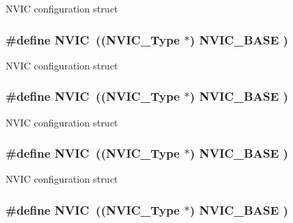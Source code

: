 N\-V\-I\-C configuration struct \hypertarget{group___c_m_s_i_s__core__base_gac8e97e8ce56ae9f57da1363a937f8a17}{
\subsubsection[{N\-V\-I\-C}]{\setlength{\rightskip}{0pt plus 5cm}\#define N\-V\-I\-C~(({\bf N\-V\-I\-C\-\_\-\-Type}      $\ast$)     {\bf N\-V\-I\-C\-\_\-\-B\-A\-S\-E}     )}}\label{group___c_m_s_i_s__core__base_gac8e97e8ce56ae9f57da1363a937f8a17}
N\-V\-I\-C configuration struct \hypertarget{group___c_m_s_i_s__core__base_gac8e97e8ce56ae9f57da1363a937f8a17}{
\subsubsection[{N\-V\-I\-C}]{\setlength{\rightskip}{0pt plus 5cm}\#define N\-V\-I\-C~(({\bf N\-V\-I\-C\-\_\-\-Type}      $\ast$)     {\bf N\-V\-I\-C\-\_\-\-B\-A\-S\-E}     )}}\label{group___c_m_s_i_s__core__base_gac8e97e8ce56ae9f57da1363a937f8a17}
N\-V\-I\-C configuration struct \hypertarget{group___c_m_s_i_s__core__base_gac8e97e8ce56ae9f57da1363a937f8a17}{
\subsubsection[{N\-V\-I\-C}]{\setlength{\rightskip}{0pt plus 5cm}\#define N\-V\-I\-C~(({\bf N\-V\-I\-C\-\_\-\-Type}      $\ast$)     {\bf N\-V\-I\-C\-\_\-\-B\-A\-S\-E}     )}}\label{group___c_m_s_i_s__core__base_gac8e97e8ce56ae9f57da1363a937f8a17}
N\-V\-I\-C configuration struct \hypertarget{group___c_m_s_i_s__core__base_gac8e97e8ce56ae9f57da1363a937f8a17}{
\subsubsection[{N\-V\-I\-C}]{\setlength{\rightskip}{0pt plus 5cm}\#define N\-V\-I\-C~(({\bf N\-V\-I\-C\-\_\-\-Type}      $\ast$)     {\bf N\-V\-I\-C\-\_\-\-B\-A\-S\-E}     )}}\label{group___c_m_s_i_s__core__base_gac8e97e8ce56ae9f57da1363a937f8a17}
